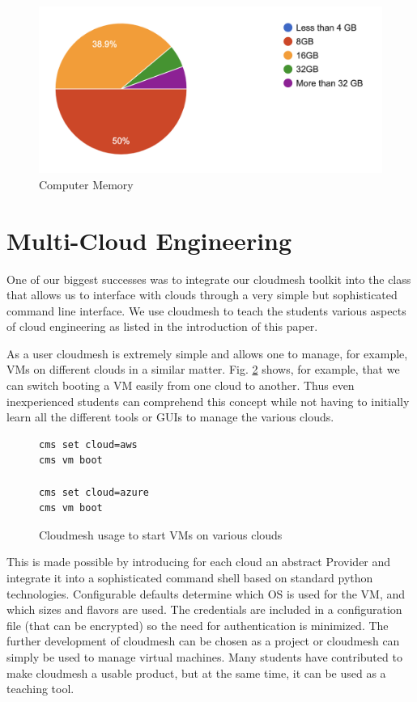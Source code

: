 \documentclass[conference]{IEEEtran}
\begin{document}
\begin{figure}[htb]
  \caption{Computer Memory}\label{fig:computer-memory}
  \centering
    \includegraphics[width=0.9\columnwidth]{images/computer.png}

\end{figure}






\section{Multi-Cloud Engineering}

One of our biggest successes was to integrate our cloudmesh toolkit
into the class that allows us to interface with clouds through a very
simple but sophisticated command line interface. We use cloudmesh to
teach the students various aspects of cloud engineering as listed in
the introduction of this paper.

As a user cloudmesh is extremely simple and allows one to manage, for
example, VMs on different clouds in a similar
matter. Fig. \ref{fig:cloudmesh-multi} shows, for example, that we can
switch booting a VM easily from one cloud to another. Thus even
inexperienced students can comprehend this concept while not having to
initially learn all the different tools or GUIs to manage the various
clouds.

\begin{figure}[htb]

\caption{Cloudmesh usage to start VMs on various clouds}\label{fig:cloudmesh-multi}

\begin{verbatim}
cms set cloud=aws
cms vm boot

cms set cloud=azure
cms vm boot
\end{verbatim}

  \end{figure}

This is made possible by introducing for each cloud an abstract
Provider and integrate it into a sophisticated command shell based on
standard python technologies. Configurable defaults determine which OS
is used for the VM, and which sizes and flavors are used. The
credentials are included in a configuration file (that can be
encrypted) so the need for authentication is minimized. The further
development of cloudmesh can be chosen as a project or cloudmesh can
simply be used to manage virtual machines. Many students have
contributed to make cloudmesh a usable product, but at the same time, it
can be used as a teaching tool.
\end{document}
